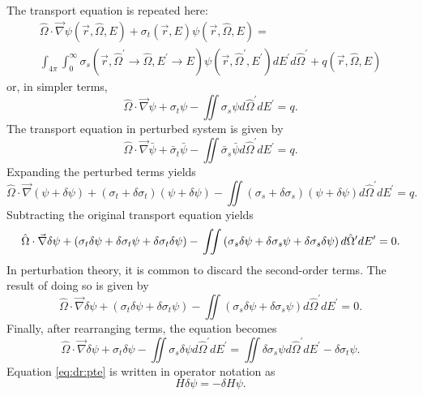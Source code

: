 The transport equation is repeated here:
\begin{multline}\label{eq:dr:te}
  \hat{\Omega}\cdot\vec{\nabla}\psi\left(\vec{r},\hat{\Omega},E\right) +
  \sigma_t\left(\vec{r},E\right)\psi\left(\vec{r},\hat{\Omega},E\right) = \\
  \int_{4\pi}\int_0^\infty\sigma_s\left(\vec{r},\hat{\Omega}^\prime\rightarrow\hat{\Omega},E^\prime\rightarrow E\right)\psi\left(\vec{r},\hat{\Omega}^\prime,E^\prime\right)dE^\prime d\hat{\Omega}^\prime +
  q\left(\vec{r},\hat{\Omega},E\right)
\end{multline}
or, in simpler terms,
\begin{equation}\label{eq:dr:te_simple}
  \hat{\Omega}\cdot\vec{\nabla}\psi +
  \sigma_t\psi -
  \iint\sigma_s\psi d\hat{\Omega}^\prime dE^\prime =
  q.
\end{equation}
The transport equation in perturbed system is given by
\begin{equation}\label{eq:dr:te_pert}
  \hat{\Omega}\cdot\vec{\nabla}\bar{\psi} +
  \bar{\sigma}_t\bar{\psi} -
  \iint\bar{\sigma}_s\bar{\psi} d\hat{\Omega}^\prime dE^\prime =
  q.
\end{equation}
Expanding the perturbed terms yields
\begin{equation}\label{eq:dr:te_pert_2}
  \hat{\Omega}\cdot\vec{\nabla}\left(\psi + \delta\psi\right) +
  \left(\sigma_t + \delta\sigma_t\right)\left(\psi + \delta\psi\right) -
  \iint\left(\sigma_s + \delta\sigma_s\right)\left(\psi + \delta\psi\right)d\hat{\Omega}^\prime dE^\prime =
  q.
\end{equation}
Subtracting the original transport equation yields
\begin{equation}\label{eq:dr:te_pert_3}
  \hat{\Omega}\cdot\vec{\nabla}\delta\psi +
  \left(\sigma_t\delta\psi + \delta\sigma_t\psi + \delta\sigma_t\delta\psi\right) - \\
  \iint\left(\sigma_s\delta\psi + \delta\sigma_s\psi + \delta\sigma_s\delta\psi\right)d\hat{\Omega}^\prime dE^\prime =
  0.
\end{equation}
In perturbation theory, it is common to discard the second-order terms.
The result of doing so is given by
\begin{equation}\label{eq:dr:te_pert_4}
  \hat{\Omega}\cdot\vec{\nabla}\delta\psi +
  \left(\sigma_t\delta\psi + \delta\sigma_t\psi\right) -
  \iint\left(\sigma_s\delta\psi + \delta\sigma_s\psi\right)d\hat{\Omega}^\prime dE^\prime =
  0.
\end{equation}
Finally, after rearranging terms, the equation becomes
\begin{equation}\label{eq:dr:pte}
  \hat{\Omega}\cdot\vec{\nabla}\delta\psi +
  \sigma_t\delta\psi -
  \iint\sigma_s\delta\psi d\hat{\Omega}^\prime dE^\prime =
  \iint\delta\sigma_s\psi d\hat{\Omega}^\prime dE^\prime - \delta\sigma_t\psi.
\end{equation}
Equation \ref{eq:dr:pte} is written in operator notation as
\begin{equation}
  H\delta\psi = -\delta H\psi.
\end{equation}

